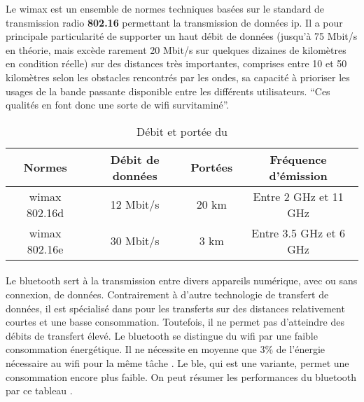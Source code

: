 Le \gls{wimax} est un ensemble de normes techniques basées sur le standard de transmission radio \textbf{802.16}
permettant la transmission de données \gls{ip}.\newline
Il a pour principale particularité de supporter un haut débit de données (jusqu’à 75 Mbit/s en théorie, mais
excède rarement 20 Mbit/s sur quelques dizaines de kilomètres en condition réelle) sur des distances très importantes,
comprises entre 10 et 50 kilomètres selon les obstacles rencontrés par les ondes, sa capacité à prioriser les usages de
la bande passante disponible entre les différents utilisateurs. \enquote{Ces qualités en font donc une sorte
    de \gls{wifi} survitaminé}{\cite{wimax}}.

\begin{table}[H]
    \centering
    \begin{tabular}{|c|c|c|c|}
        \hline
        \rowcolor{tableColorDark} Normes & Débit de données & Portées & Fréquence d'émission   \\
        \hline

        \gls{wimax} 802.16d              & 12 Mbit/s        & 20 km   & Entre 2 GHz et 11 GHz  \\\hline
        \gls{wimax} 802.16e              & 30 Mbit/s        & 3 km    & Entre 3.5 GHz et 6 GHz \\\hline
    \end{tabular}
    \label{tab:debitPorteeWimax}
    \caption{Débit et portée du }
    \nocite{debitPortee}
\end{table}


\paragraph{}
\label{sec:bluetooth}

Le \gls{bluetooth} sert à la transmission entre divers appareils numérique, avec ou sans connexion,
de données. Contrairement à d'autre technologie de transfert de données, il est
spécialisé dans pour les transferts sur des distances relativement courtes et une basse
consommation. Toutefois, il ne permet pas d'atteindre des débits de transfert élevé.\newline
Le \gls{bluetooth} se distingue du \gls{wifi} par une faible consommation énergétique. Il
ne nécessite en moyenne que 3\% de l'énergie nécessaire au \gls{wifi} pour la même tâche \cite{bluetoothConsumption}.
Le \gls{ble}, qui est une variante, permet une consommation encore plus faible.\newline
On peut résumer les performances du \gls{bluetooth} par ce tableau \cite{debitPortee, ble}.


